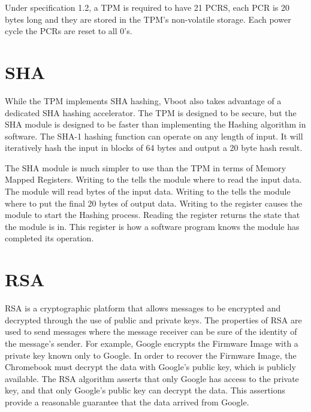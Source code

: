 Under specification 1.2, a TPM is required to have 21 PCRS, each PCR is 20 bytes
long and they are stored in the TPM's non-volatile storage.
Each power cycle the PCRs are reset to all 0's.


\section{SHA}

While the TPM implements SHA hashing, Vboot also takes advantage of a dedicated
SHA hashing accelerator. 
The TPM is designed to be secure, but the SHA module is designed to be faster
than implementing the Hashing algorithm in software.
The SHA-1 hashing function can operate on any length of input.
It will iteratively hash the input in blocks of 64 bytes and output a 20 byte
hash result.


The SHA module is much simpler to use than the TPM in terms of Memory Mapped
Registers. 
Writing to the  tells the module where to read the input data.
The module will read  bytes of the input data.
Writing to the  tells the module where to put the final 20
bytes of output data.
Writing to the   register causes the module to start the
Hashing process.
Reading the  register returns the state that the module is in.
This register is how a software program knows the module has completed its
operation.

\section{RSA}

RSA is a cryptographic platform that allows messages to be encrypted and
decrypted through the use of public and private keys.
The properties of RSA are used to send messages where the message 
receiver can be sure of the identity of the message's sender. 
For example, Google encrypts the Firmware Image with a private key known only to Google.
In order to recover the Firmware Image, the Chromebook must decrypt the data with Google's public key, which is publicly available. 
The RSA algorithm asserts that only Google has access to the private 
key, and that only Google's public key can decrypt the data.
This assertions provide a reasonable guarantee that the data arrived from Google.

